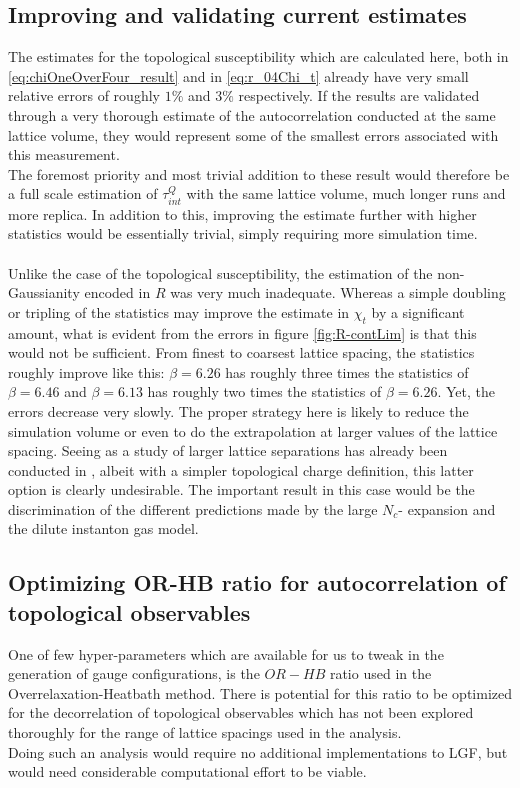 \documentclass[a4paper,10pt]{book}
\begin{document}
\subsection{Improving and validating current estimates}
The estimates for the topological susceptibility which are calculated here, both in \eqref{eq:chiOneOverFour_result} and in \eqref{eq:r_04Chi_t} already have very small relative errors of roughly $1\%$ and $3\%$ respectively. If the results are validated through a very thorough estimate of the autocorrelation conducted at the same lattice volume, they would represent some of the smallest errors associated with this measurement.\\The foremost priority and most trivial addition to these result would therefore be a full scale estimation of $\tau_{int}^Q$ with the same lattice volume, much longer runs and more replica. In addition to this, improving the estimate further with higher statistics would be essentially trivial, simply requiring more simulation time.\\\\Unlike the case of the topological susceptibility, the estimation of the non-Gaussianity encoded in $R$ was very much inadequate. Whereas a simple doubling or tripling of the statistics may improve the estimate in $\chi_t$ by a significant amount, what is evident from the errors in figure \ref{fig:R-contLim} is that this would not be sufficient. From finest to coarsest lattice spacing, the statistics roughly improve like this: $\beta=6.26$ has roughly three times the statistics of $\beta=6.46$ and $\beta=6.13$ has roughly two times the statistics of $\beta=6.26$. Yet, the errors decrease very slowly. The proper strategy here is likely to reduce the simulation volume or even to do the extrapolation at larger values of the lattice spacing. Seeing as a study of larger lattice separations has already been conducted in \cite{non_gaussianities2015}, albeit with a simpler topological charge definition, this latter option is clearly undesirable. The important result in this case would be the discrimination of the different predictions made by the large $N_c$- expansion and the dilute instanton gas model.
\subsection{Optimizing OR-HB ratio for autocorrelation of topological observables}
One of few hyper-parameters which are available for us to tweak in the generation of gauge configurations, is the $OR-HB$ ratio used in the Overrelaxation-Heatbath method. There is potential for this ratio to be optimized for the decorrelation of topological observables which has not been explored thoroughly for the range of lattice spacings used in the analysis.\\Doing such an analysis would require no additional implementations to LGF, but would need considerable computational effort to be viable. 
\end{document}
